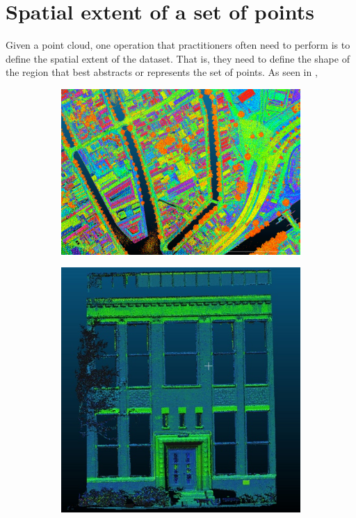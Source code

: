 
\setchapterpreamble[u]{\margintoc}
\graphicspath{{spatialextent/}}

\chapter{Spatial extent of a set of points}%
\label{chap:spatialextent}


Given a point cloud, one operation that practitioners often need to perform is to define the spatial extent of the dataset.
That is, they need to define the shape of the region that best abstracts or represents the set of points.
As seen in , 
\begin{figure}
  \centering
  \begin{subfigure}[b]{0.35\linewidth}
    \centering
    \includegraphics[width=\textwidth]{figs/ahn3-water.png}
    \caption{}
  \end{subfigure}%
  \qquad
  \begin{subfigure}[b]{0.24\linewidth}
    \centering
    \includegraphics[page=2,width=\textwidth]{figs/facade.jpg}

\end{subfigure}
\end{figure}
